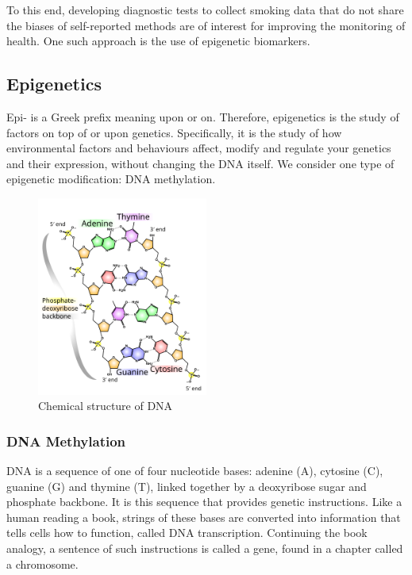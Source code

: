 \documentclass{article}
\begin{document}
To this end, developing diagnostic tests to collect smoking data that do not share the biases of self-reported methods are of interest for improving the monitoring of health. One such approach is the use of epigenetic biomarkers.

\subsection{Epigenetics}
Epi- is a Greek prefix meaning upon or on. Therefore, epigenetics is the study of factors on top of or upon genetics. Specifically, it is the study of how environmental factors and behaviours affect, modify and regulate your genetics and their expression, without changing the DNA itself. We consider one type of epigenetic modification: DNA methylation.

\begin{figure}
    \centering
    \includegraphics[width=0.5\textwidth]{512px-DNA_chemical_structure.svg.png}
    \caption*{Chemical structure of DNA \cite{ball_DNA_structure}}
\end{figure}

\subsubsection{DNA Methylation}
DNA is a sequence of one of four nucleotide bases: adenine (A), cytosine (C), guanine (G) and thymine (T), linked together by a deoxyribose sugar and phosphate backbone. It is this sequence that provides genetic instructions. Like a human reading a book, strings of these bases are converted into information that tells cells how to function, called DNA transcription. Continuing the book analogy, a sentence of such instructions is called a gene, found in a chapter called a chromosome.
\end{document}
